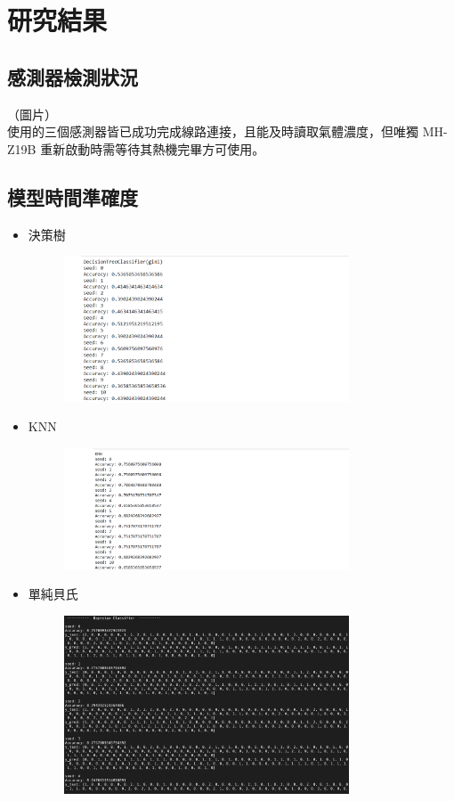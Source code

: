\chapter{研究結果}

\section{感測器檢測狀況}
（圖片）\\
使用的三個感測器皆已成功完成線路連接，且能及時讀取氣體濃度，但唯獨 MH-Z19B 重新啟動時需等待其熱機完畢方可使用。

\section{模型時間準確度}
\begin{itemize}
	\item 決策樹
	\begin{figure}[H]
		\centering
		\includegraphics[width=0.8\textwidth]{pic/decisiontree.png}
	\end{figure}
	\item KNN
	\begin{figure}[H]
		\centering
		\includegraphics[width=0.8\textwidth]{pic/knn.png}
	\end{figure}
	\item 單純貝氏
	\begin{figure}[H]
		\centering
		\includegraphics[width=0.8\textwidth]{pic/Bayesian.png}

\end{figure}
\end{itemize}
